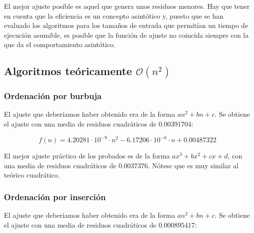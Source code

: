 \documentclass[a4paper, 11pt]{article} %
\begin{document}
El mejor ajuste posible es aquel que genera unos residuos menores. Hay que tener en cuenta que la 
eficiencia es un concepto asintótico y, puesto que se han evaluado los algoritmos
para los tamaños de entrada que permitían un tiempo de ejecución asumible, 
es posible que la función de ajuste no coincida siempre con la que da el comportamiento asintótico.

\subsection{Algoritmos teóricamente $\mathcal{O}(n^2)$}

  \subsubsection{Ordenación por burbuja}
  El ajuste que deberíamos haber obtenido era de la forma $a n^2+bn+c$.
  Se obtiene el ajuste con una media de residuos cuadráticos de $0.00391704$:
 
 $$f(n)=4.20281\cdot 10^{-9}\cdot n^2-6.17206\cdot 10^{-6}\cdot n +0.00487322$$
 
 El mejor ajuste práctico de los probados es de la forma $ax^3+bx^2+cx+d$,
  con una media de residuos cuadráticos de $0.0037376$. Nótese que es muy similar
  al teórico cuadrático.

    \noindent{}

  \subsubsection{Ordenación por inserción}
  El ajuste que deberíamos haber obtenido era de la forma $a n^2+bn+c$.
  Se obtiene el ajuste con una media de residuos cuadráticos de $0.000895417$:
\end{document}
